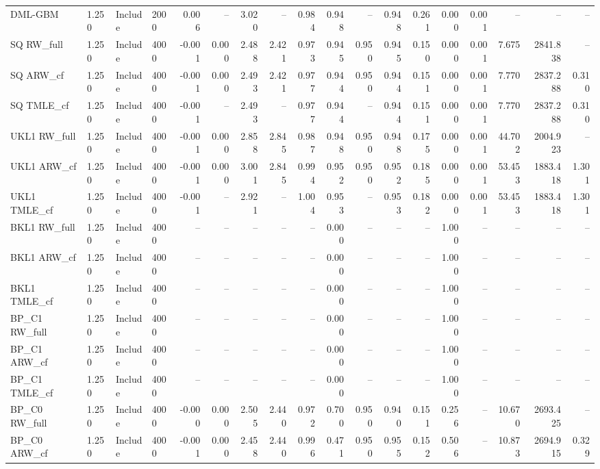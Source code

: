 \begin{tabular}{llllrrrrrrrrrrrrrr}
DML-GBM & 1.250 & Include & 2000 & 0.006 & -- & 3.020 & -- & 0.984 & 0.948 & -- & 0.948 & 0.261 & 0.000 & 0.001 & -- & -- & -- \\
SQ RW\_full & 1.250 & Include & 4000 & -0.001 & 0.000 & 2.488 & 2.421 & 0.973 & 0.945 & 0.950 & 0.945 & 0.150 & 0.000 & 0.001 & 7.675 & 2841.838 & -- \\
SQ ARW\_cf & 1.250 & Include & 4000 & -0.001 & 0.000 & 2.493 & 2.421 & 0.977 & 0.944 & 0.950 & 0.944 & 0.151 & 0.000 & 0.001 & 7.770 & 2837.288 & 0.310 \\
SQ TMLE\_cf & 1.250 & Include & 4000 & -0.001 & -- & 2.493 & -- & 0.977 & 0.944 & -- & 0.944 & 0.151 & 0.000 & 0.001 & 7.770 & 2837.288 & 0.310 \\
UKL1 RW\_full & 1.250 & Include & 4000 & -0.001 & 0.000 & 2.858 & 2.845 & 0.987 & 0.948 & 0.950 & 0.948 & 0.175 & 0.000 & 0.001 & 44.702 & 2004.923 & -- \\
UKL1 ARW\_cf & 1.250 & Include & 4000 & -0.001 & 0.000 & 3.001 & 2.845 & 0.994 & 0.952 & 0.950 & 0.952 & 0.185 & 0.000 & 0.001 & 53.453 & 1883.418 & 1.301 \\
UKL1 TMLE\_cf & 1.250 & Include & 4000 & -0.001 & -- & 2.921 & -- & 1.004 & 0.953 & -- & 0.953 & 0.182 & 0.000 & 0.001 & 53.453 & 1883.418 & 1.301 \\
BKL1 RW\_full & 1.250 & Include & 4000 & -- & -- & -- & -- & -- & 0.000 & -- & -- & -- & 1.000 & -- & -- & -- & -- \\
BKL1 ARW\_cf & 1.250 & Include & 4000 & -- & -- & -- & -- & -- & 0.000 & -- & -- & -- & 1.000 & -- & -- & -- & -- \\
BKL1 TMLE\_cf & 1.250 & Include & 4000 & -- & -- & -- & -- & -- & 0.000 & -- & -- & -- & 1.000 & -- & -- & -- & -- \\
BP\_C1 RW\_full & 1.250 & Include & 4000 & -- & -- & -- & -- & -- & 0.000 & -- & -- & -- & 1.000 & -- & -- & -- & -- \\
BP\_C1 ARW\_cf & 1.250 & Include & 4000 & -- & -- & -- & -- & -- & 0.000 & -- & -- & -- & 1.000 & -- & -- & -- & -- \\
BP\_C1 TMLE\_cf & 1.250 & Include & 4000 & -- & -- & -- & -- & -- & 0.000 & -- & -- & -- & 1.000 & -- & -- & -- & -- \\
BP\_C0 RW\_full & 1.250 & Include & 4000 & -0.000 & 0.000 & 2.505 & 2.440 & 0.972 & 0.700 & 0.950 & 0.940 & 0.151 & 0.256 & -- & 10.670 & 2693.425 & -- \\
BP\_C0 ARW\_cf & 1.250 & Include & 4000 & -0.001 & 0.000 & 2.458 & 2.440 & 0.996 & 0.471 & 0.950 & 0.955 & 0.152 & 0.506 & -- & 10.873 & 2694.915 & 0.329 \\

\end{tabular}
